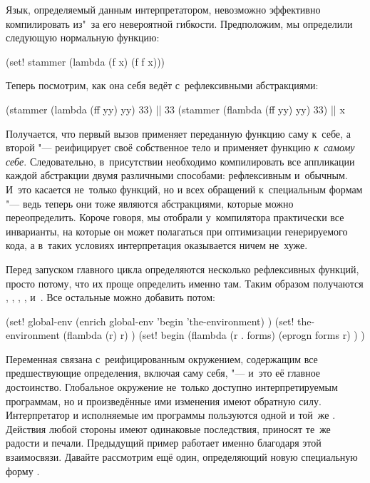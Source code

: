Язык, определяемый данным интерпретатором, невозможно эффективно компилировать
из"~за его невероятной гибкости. Предположим, мы определили следующую нормальную
функцию:

\begin{code:lisp}
(set! stammer (lambda (f x) (f f x)))
\end{code:lisp}

Теперь посмотрим, как она себя ведёт с~рефлексивными абстракциями:

\begin{code:lisp}
(stammer (lambda (ff yy) yy) 33)  |\is| 33
(stammer (flambda (ff yy) yy) 33) |\is| x
\end{code:lisp}

Получается, что первый вызов  применяет переданную функцию саму
к~себе, а второй "--- реифицирует своё собственное тело и применяет функцию
\emph{к~самому себе}. Следовательно, в~присутствии  необходимо
компилировать все аппликации каждой абстракции двумя различными способами:
рефлексивным и~обычным. И~это касается не~только функций, но и всех обращений
к~специальным формам "--- ведь теперь они тоже являются абстракциями, которые
можно переопределить. Короче говоря, мы отобрали у~компилятора практически все
инварианты, на которые он может полагаться при оптимизации генерируемого кода,
а в~таких условиях интерпретация оказывается ничем не~хуже.

Перед запуском главного цикла определяются несколько рефлексивных функций,
просто потому, что их проще определить именно там. Таким образом получаются
, , , ,  и~. Все
остальные можно добавить потом:

\begin{code:lisp}
(set! global-env
      (enrich global-env 'begin 'the-environment) )
(set! the-environment
      (flambda (r) r) )
(set! begin
      (flambda (r . forms)
        (eprogn forms r) ) )
\end{code:lisp}

Переменная  связана с~реифицированным окружением, содержащим все
предшествующие определения, включая саму себя, "--- и~это её главное
достоинство. Глобальное окружение не~только доступно интерпретируемым
программам, но и произведённые ими изменения имеют обратную силу. Интерпретатор
и исполняемые им программы пользуются одной и той~же . Действия
любой стороны имеют одинаковые последствия, приносят те~же радости и печали.
Предыдущий пример работает именно благодаря этой взаимосвязи. Давайте рассмотрим
ещё один, определяющий новую специальную форму .

